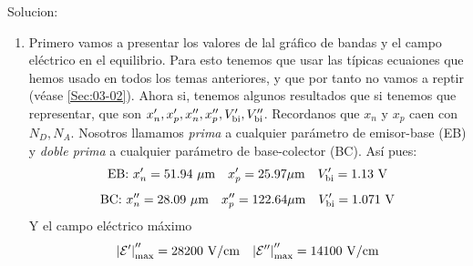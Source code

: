 Solucion: 

\begin{enumerate}[label=\alph*)]
    \item Primero vamos a presentar los valores de lal gráfico de bandas y el campo eléctrico en el equilibrio. Para esto tenemos que usar las típicas ecuaiones que hemos usado en todos los temas anteriores, y que por tanto no vamos a reptir (véase \ref{Sec:03-02}). Ahora si, tenemos algunos resultados que si tenemos que representar, que son $x_n',x_p',x_n'',x_p'',V_{\text{bi}}',V_{\text{bi}}''$. Recordanos que $x_n$ y $x_p$ caen con $N_D,N_A$.  Nosotros llamamos \textit{prima} a cualquier parámetro de emisor-base (EB) y \textit{doble prima} a cualquier parámetro de base-colector (BC). Así pues:
    \begin{equation}
        \text{EB:} \ x_n'=51.94 \ \mu \unit{m} \quad  x_p'=25.97  \mu \unit{m} \quad \Vbi'=1.13 \ \unit{V}
    \end{equation}
    \begin{equation}
        \text{BC:} \ x_n''=28.09 \ \mu \unit{m} \quad  x_p''=122.64  \mu \unit{m} \quad \Vbi'= 1.071 \ \unit{V}
    \end{equation}
    Y el campo eléctrico máximo
    \begin{equation}
       \abs{\Ecal'}_{\max}''=28200 \ \unit{V/cm} \quad  
       \abs{\Ecal''}_{\max}''=14100 \ \unit{V/cm} 
    \end{equation}


\end{enumerate}
